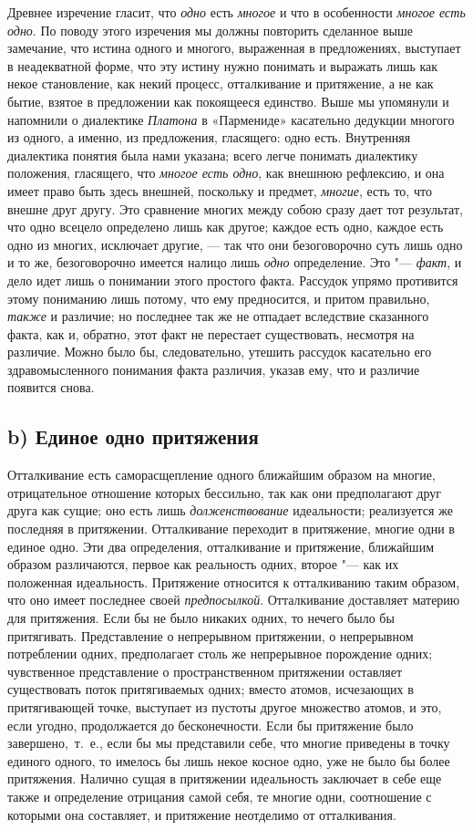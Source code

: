 Древнее изречение гласит, что {\em одно} есть
{\em многое} и что в особенности
{\em многое есть одно}. По поводу этого изречения мы
должны повторить сделанное выше замечание, что истина одного и многого,
выраженная в предложениях, выступает в неадекватной форме, что эту истину
нужно понимать и выражать лишь как некое становление, как некий процесс,
отталкивание и притяжение, а не как бытие, взятое в предложении как
покоящееся единство. Выше мы упомянули и напомнили о диалектике
{\em Платона} в «Пармениде» касательно дедукции многого
из одного, а именно, из предложения, гласящего: одно есть. Внутренняя
диалектика понятия была нами указана; всего легче понимать диалектику
положения, гласящего, что {\em многое есть одно}, как
внешнюю рефлексию, и она имеет право быть здесь внешней, поскольку и
предмет, {\em многие}, есть то, что внешне друг другу.
Это сравнение многих между собою сразу дает тот результат, что одно всецело
определено лишь как другое; каждое есть одно, каждое есть одно из многих,
исключает другие, — так что они безоговорочно суть лишь одно и то же,
безоговорочно имеется налицо лишь {\em одно}
определение. Это "--- {\em факт}, и дело идет лишь о
понимании этого простого факта. Рассудок упрямо противится этому пониманию
лишь потому, что ему предносится, и притом правильно,
{\em также} и различие; но последнее так же не отпадает
вследствие сказанного факта, как и, обратно, этот факт не перестает
существовать, несмотря на различие. Можно было бы, следовательно, утешить
рассудок касательно его здравомысленного понимания факта различия, указав
ему, что и различие появится снова.

\subsection*{b) Единое одно притяжения}
Отталкивание есть саморасщепление одного ближайшим образом на многие,
отрицательное отношение которых бессильно, так как они предполагают друг
друга как сущие; оно есть лишь {\em долженствование}
идеальности; реализуется же последняя в притяжении. Отталкивание переходит
в притяжение, многие одни в единое одно. Эти два определения, отталкивание
и притяжение, ближайшим образом различаются, первое как реальность одних,
второе "--- как их положенная идеальность. Притяжение относится к отталкиванию
таким образом, что оно имеет последнее своей
{\em предпосылкой}. Отталкивание доставляет материю для
притяжения. Если бы не было никаких одних, то нечего было бы притягивать.
Представление о непрерывном притяжении, о непрерывном потреблении одних,
предполагает столь же непрерывное порождение одних; чувственное
представление о пространственном притяжении оставляет существовать поток
притягиваемых одних; вместо атомов, исчезающих в притягивающей точке,
выступает из пустоты другое множество атомов, и это, если угодно,
продолжается до бесконечности. Если бы притяжение было завершено,~т.~е.,
если бы мы представили себе, что многие приведены в точку единого одного,
то имелось бы лишь некое косное одно, уже не было бы более притяжения.
Налично сущая в притяжении идеальность заключает в себе еще также и
определение отрицания самой себя, те многие одни, соотношение с которыми
она составляет, и притяжение неотделимо от отталкивания.

